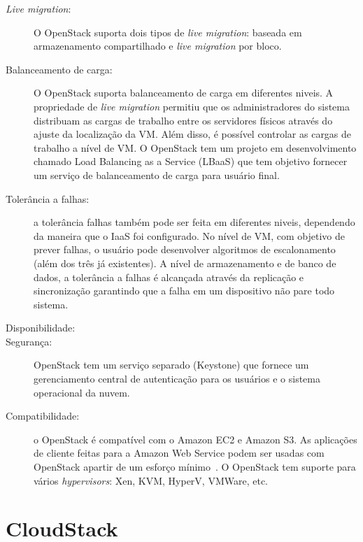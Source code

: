 \begin{description}

	\item[\textit{Live migration}:] O OpenStack suporta dois tipos de \textit{live migration}: baseada em armazenamento compartilhado e \textit{live migration} por bloco.

	\item[Balanceamento de carga:] O OpenStack suporta balanceamento de carga em diferentes niveis. A propriedade de \textit{live migration} permitiu que os administradores do sistema distribuam as cargas de trabalho entre os servidores físicos através do ajuste da localização da VM. Além disso, é possível controlar as cargas de trabalho a nível de VM. O OpenStack tem um projeto em desenvolvimento chamado Load Balancing as a Service (LBaaS) que tem objetivo fornecer um serviço de balanceamento de carga para usuário final.

	\item[Tolerância a falhas:] a tolerância  falhas também pode ser feita em diferentes niveis, dependendo da maneira que o IaaS foi configurado. No nível de VM, com objetivo de prever falhas, o usuário pode desenvolver algoritmos de escalonamento (além dos três já existentes). A nível de armazenamento e de banco de dados, a tolerância a falhas é alcançada através da replicação e sincronização garantindo que a falha em um dispositivo não pare todo sistema.

	\item[Disponibilidade:] 

	\item[Segurança:] OpenStack tem um serviço separado (Keystone) que fornece um gerenciamento central de autenticação para os usuários e o sistema operacional da nuvem.

	\item[Compatibilidade:] o OpenStack é compatível com o Amazon EC2 e Amazon S3. As aplicações de cliente feitas para a Amazon Web Service podem ser usadas com OpenStack apartir de um esforço mínimo~\cite{OpenStack:Online}. O OpenStack tem suporte para vários \textit{hypervisors}: Xen, KVM, HyperV, VMWare, etc.

\end{description}


\section{CloudStack}

